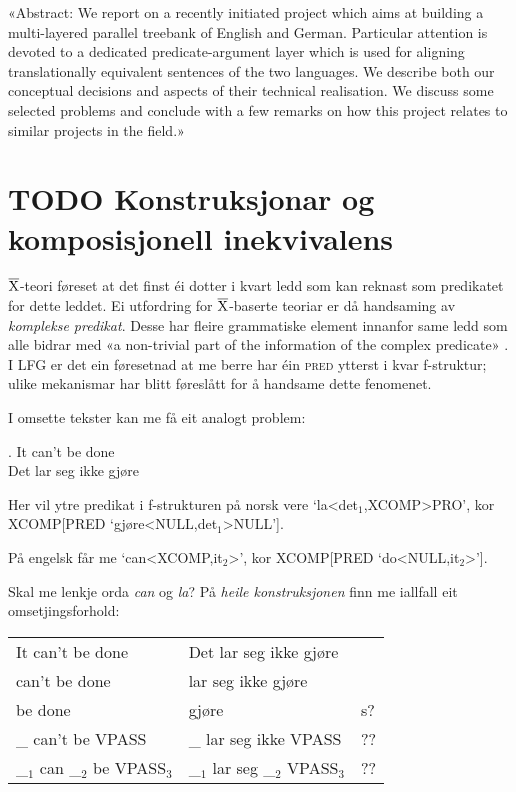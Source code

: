 \documentclass[11pt,a4paper,oneside,draft]{book}
\newcommand{\xbar}{$\rm\overline{X}$}
\begin{document}
\citet{cyrus2004apa}
«Abstract: We report on a recently initiated project which aims at
building a multi-layered parallel treebank of English and
German. Particular attention is devoted to a dedicated
predicate-argument layer which is used for aligning translationally
equivalent sentences of the two languages. We describe both our
conceptual decisions and aspects of their technical realisation. We
discuss some selected problems and conclude with a few remarks on how
this project relates to similar projects in the field.»
\section{\textbf{TODO} Konstruksjonar og komposisjonell inekvivalens}
\label{sec-3.16}

\xbar-teori føreset at det finst éi dotter i kvart ledd som kan
reknast som predikatet for dette leddet. Ei utfordring for
\xbar-baserte teoriar er då handsaming av \emph{komplekse predikat}. Desse
har fleire grammatiske element innanfor same ledd som alle bidrar med
«a non-trivial part of the information of the complex predicate»
\citep{alsina1997cp}. I LFG er det ein føresetnad at me berre har éin
\textsc{pred} ytterst i kvar f-struktur; ulike mekanismar har blitt
føreslått for å handsame dette fenomenet.

I omsette tekster kan me få eit analogt problem:

\ex. It can't be done \\
     Det lar seg ikke gjøre

Her vil ytre predikat i f-strukturen på norsk vere
`la<det$_1$,XCOMP>PRO', kor XCOMP[PRED `gjøre<NULL,det$_1$>NULL'].

På engelsk får me `can<XCOMP,it$_2$>', kor
XCOMP[PRED `do<NULL,it$_2$>']. 


Skal me lenkje orda \emph{can} og \emph{la}? På \emph{heile konstruksjonen} finn me
iallfall eit omsetjingsforhold:


\begin{center}
\begin{tabular}{lll}
 It can't be done                    &  Det lar seg ikke gjøre               &      \\
 can't be done                       &  lar seg ikke gjøre                   &      \\
 be done                             &  gjøre                                &  s?  \\
 \_{} can't be VPASS                 &  \_{} lar seg ikke VPASS              &  ??  \\
 \_$_{1}$ can \_$_{2}$ be VPASS$_3$  &  \_$_{1}$ lar seg \_$_{2}$ VPASS$_3$  &  ??  \\
\end{tabular}
\end{center}
\end{document}
